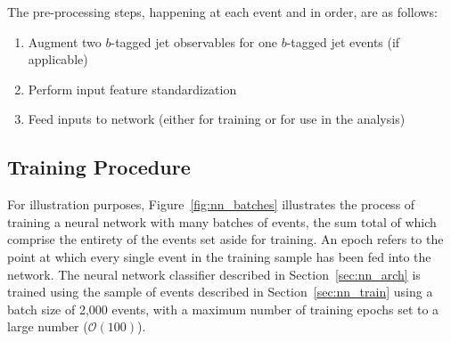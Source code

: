 The pre-processing steps, happening at each event and in order, are as follows:
\begin{enumerate}
    \item Augment two $b$-tagged jet observables for one $b$-tagged jet events (if applicable)
    \item Perform input feature standardization
    \item Feed inputs to network (either for training or for use in the analysis)
\end{enumerate}

%
%

\subsection{Training Procedure}
\label{sec:nn_train_procedure}

For illustration purposes, Figure~\ref{fig:nn_batches} illustrates the process of training
a neural network with many batches of events, the sum total of which comprise the entirety
of the events set aside for training.
An epoch refers to the point at which every single event in the training sample has been fed into
the network.
The neural network classifier described in Section~\ref{sec:nn_arch} is trained using the 
sample of events described in Section~\ref{sec:nn_train} using a batch size of 2,000 events,
with a maximum number of training epochs set to a large number ($\mathcal{O}(100)$).

